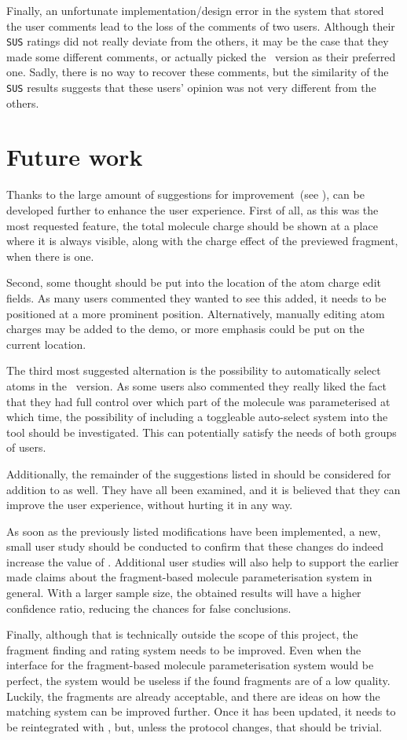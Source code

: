 Finally, an unfortunate implementation/design error in the system that stored the user comments lead to the loss of the comments of two users. Although their \verb|SUS| ratings did not really deviate from the others, it may be the case that they made some different comments, or actually picked the \IDb\ version as their preferred one. Sadly, there is no way to recover these comments, but the similarity of the \verb|SUS| results suggests that these users' opinion was not very different from the others.



\section{Future work}
Thanks to the large amount of suggestions for improvement~(see ), \oframp{} can be developed further to enhance the user experience. First of all, as this was the most requested feature, the total molecule charge should be shown at a place where it is always visible, along with the charge effect of the previewed fragment, when there is one.

Second, some thought should be put into the location of the atom charge edit fields. As many users commented they wanted to see this added, it needs to be positioned at a more prominent position. Alternatively, manually editing atom charges may be added to the demo, or more emphasis could be put on the current location.

The third most suggested alternation is the possibility to automatically select atoms in the \IDa\ version. As some users also commented they really liked the fact that they had full control over which part of the molecule was parameterised at which time, the possibility of including a toggleable auto-select system into the tool should be investigated. This can potentially satisfy the needs of both groups of users.

Additionally, the remainder of the suggestions listed in  should be considered for addition to \oframp{} as well. They have all been examined, and it is believed that they can improve the user experience, without hurting it in any way.

As soon as the previously listed modifications have been implemented, a new, small user study should be conducted to confirm that these changes do indeed increase the value of \oframp. Additional user studies will also help to support the earlier made claims about the fragment-based molecule parameterisation system in general. With a larger sample size, the obtained results will have a higher confidence ratio, reducing the chances for false conclusions.

Finally, although that is technically outside the scope of this project, the fragment finding and rating system needs to be improved. Even when the interface for the fragment-based molecule parameterisation system would be perfect, the system would be useless if the found fragments are of a low quality. Luckily, the fragments are already acceptable, and there are ideas on how the matching system can be improved further. Once it has been updated, it needs to be reintegrated with \oframp, but, unless the protocol changes, that should be trivial.
